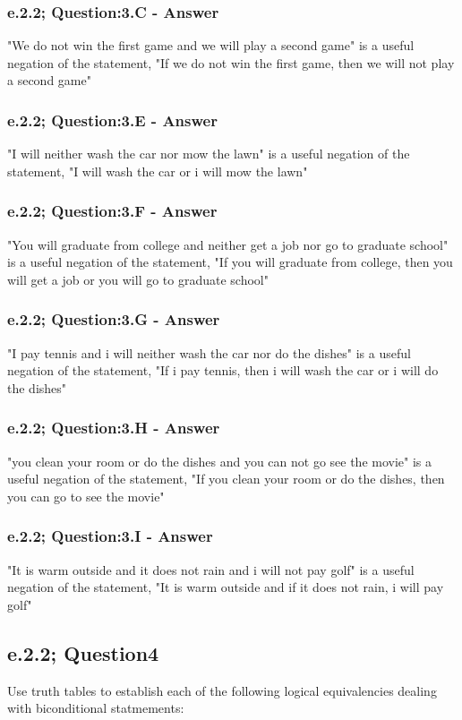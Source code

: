 \subsubsection*{e.2.2; Question:3.C - Answer}
"We do not win the first game and we will play a second game" is a useful negation of the statement, "If we do not win the first game, then we will not play a second game"


\subsubsection*{e.2.2; Question:3.E - Answer}
"I will neither wash the car nor mow the lawn" is a useful negation of the statement, "I will wash the car or i will mow the lawn"


\subsubsection*{e.2.2; Question:3.F - Answer}
"You will graduate from college and neither get a job nor go to graduate school" is a useful negation of the statement, "If you will graduate from college, then you will get a job or you will go to graduate school"


\subsubsection*{e.2.2; Question:3.G - Answer}
"I pay tennis and i will neither wash the car nor do the dishes" is a useful negation of the statement, "If i pay tennis, then i will wash the car or i will do the dishes"


\subsubsection*{e.2.2; Question:3.H - Answer}
"you clean your room or do the dishes and you can not go see the movie" is a useful negation of the statement, "If you clean your room or do the dishes, then you can go to see the movie"


\subsubsection*{e.2.2; Question:3.I - Answer}
"It is warm outside and it does not rain and i will not pay golf" is a useful negation of the statement, "It is warm outside and if it does not rain, i will pay golf"


\subsection{e.2.2; Question4}
Use truth tables to establish each of the following logical equivalencies dealing with biconditional statmements: 

